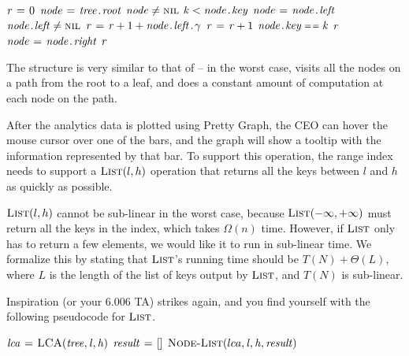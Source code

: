 \documentclass[12pt,twoside]{article}
\begin{document}
\begin{problems}
\begin{problemparts}
{  \begin{codebox}
  \li $\id{r} \gets 0$
  \li $\id{node} \gets \attribii{tree}{root}$
  \li \While $\id{node} \neq \const{nil}$
  \li \Do
        \If $\id{k} < \attribii{node}{key}$
  \li   \Then
          $\id{node} \gets \attribii{node}{left}$
  \li   \Else
  \li     \If $\attribii{node}{left} \neq \const{nil}$
  \li     \Then
            $\id{r} \gets \id{r} + 1 + \attribii{\attribii{node}{left}}{\gamma}$
  \li     \Else
  \li       $\id{r} \gets \id{r} + 1$
          \End
  \li     \If $\attribii{node}{key} \isequal \id{k}$
  \li     \Then
            \Return $\id{r}$
          \End
  \li     $\id{node} \gets \attribii{node}{right}$
        \End
      \End
  \li \Return $\id{r}$
  \end{codebox}
  
  The structure is very similar to that of  -- in the worst case,
   visits all the nodes on a path from the root to a leaf, and does a
  constant amount of computation at each node on the path.
}
\end{problemparts}

After the analytics data is plotted using Pretty Graph\texttrademark{}, the CEO
can hover the mouse cursor over one of the bars, and the graph will show a
tooltip with the information represented by that bar. To support this operation,
the range index needs to support a $\textnormal{\scshape List}(l, h)$ operation that returns
all the keys between $l$ and $h$ as quickly as possible.

$\textnormal{\scshape List}(l, h)$ cannot be sub-linear in the worst case, because
$\textnormal{\scshape List}(-\infty, +\infty)$ must return all the keys in the index, which
takes $\Omega(n)$ time. However, if $\textnormal{\scshape List}$ only has to return a few
elements, we would like it to run in sub-linear time. We formalize this by
stating that $\textnormal{\scshape List}$'s running time should be $T(N) + \Theta(L)$, where
$L$ is the length of the list of keys output by $\textnormal{\scshape List}$, and $T(N)$ is
sub-linear.

Inspiration (or your 6.006 TA) strikes again, and you find yourself with
the following pseudocode for $\textnormal{\scshape List}$.

\begin{codebox}
\li $\id{lca} \gets \proc{LCA}(\id{tree}, \id{l}, \id{h})$
\li $\id{result} \gets []$
\li $\proc{Node-List}(lca, \id{l}, \id{h}, \id{result})$
    \label{li:list-node-list}
\li \Return {}
\end{codebox}


\end{problems}
\end{document}
